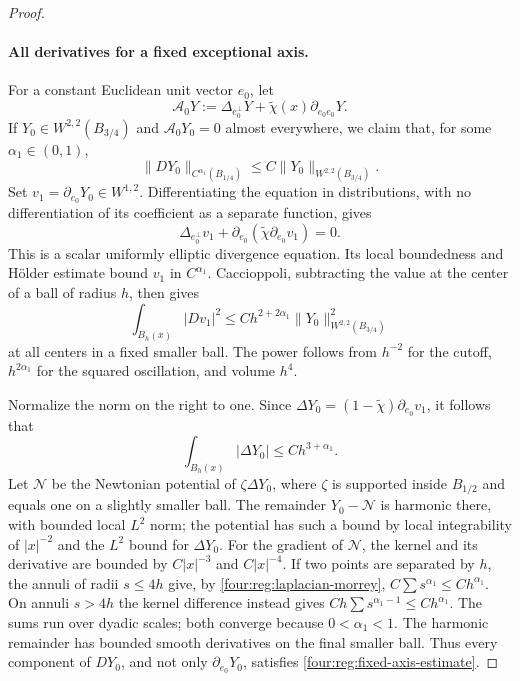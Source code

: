 \begin{proof}
\paragraph{All derivatives for a fixed exceptional axis.}
For a constant Euclidean unit vector $e_0$, let
\begin{equation}\label{four:reg:fixed-axis-operator}
 \mathcal A_0Y:=\Delta_{e_0^\perp}Y
                 +\widetilde\chi(x)\partial_{e_0e_0}Y.
\end{equation}
If $Y_0\in W^{2,2}(B_{3/4})$ and $\mathcal A_0Y_0=0$ almost
everywhere, we claim that, for some $\alpha_1\in(0,1)$,
\begin{equation}\label{four:reg:fixed-axis-estimate}
 \|DY_0\|_{C^{\alpha_1}(B_{1/4})}
       \le C\|Y_0\|_{W^{2,2}(B_{3/4})}.
\end{equation}
Set $v_1=\partial_{e_0}Y_0\in W^{1,2}$.  Differentiating the
equation in distributions, with no differentiation of its
coefficient as a separate function, gives
\[
 \Delta_{e_0^\perp}v_1+\partial_{e_0}
                (\widetilde\chi\partial_{e_0}v_1)=0.
\]
This is a scalar uniformly elliptic divergence equation.  Its local
boundedness and H\"older estimate bound $v_1$ in $C^{\alpha_1}$.
Caccioppoli, subtracting the value at the center of a ball of radius
$h$, then gives
\begin{equation}\label{four:reg:fixed-axis-morrey}
 \int_{B_h(x)}|Dv_1|^2\le Ch^{2+2\alpha_1}
                   \|Y_0\|_{W^{2,2}(B_{3/4})}^2
\end{equation}
at all centers in a fixed smaller ball.  The power follows from
$h^{-2}$ for the cutoff, $h^{2\alpha_1}$ for the squared
oscillation, and volume $h^4$.

Normalize the norm on the right to one.  Since
$\Delta Y_0=(1-\widetilde\chi)\partial_{e_0}v_1$, it follows that
\begin{equation}\label{four:reg:laplacian-morrey}
 \int_{B_h(x)}|\Delta Y_0|\le Ch^{3+\alpha_1}.
\end{equation}
Let $\mathcal N$ be the Newtonian potential of $\zeta\Delta Y_0$, where
$\zeta$ is supported inside $B_{1/2}$ and equals one on a slightly
smaller ball.  The remainder $Y_0-\mathcal N$ is harmonic there, with bounded
local $L^2$ norm; the potential has such a bound by local integrability
of $|x|^{-2}$ and the $L^2$ bound for $\Delta Y_0$.  For the gradient
of $\mathcal N$, the kernel and its derivative are bounded by $C|x|^{-3}$
and $C|x|^{-4}$.  If two points are separated by $h$, the annuli of
radii $s\le4h$ give, by \eqref{four:reg:laplacian-morrey},
$C\sum s^{\alpha_1}\le Ch^{\alpha_1}$.  On annuli $s>4h$ the
kernel difference instead gives
$Ch\sum s^{\alpha_1-1}\le Ch^{\alpha_1}$.
The sums run over dyadic scales; both converge because
$0<\alpha_1<1$.  The harmonic remainder has bounded smooth
derivatives on the final smaller ball.  Thus every component of
$DY_0$, and not only $\partial_{e_0}Y_0$, satisfies
\eqref{four:reg:fixed-axis-estimate}.


\end{proof}
